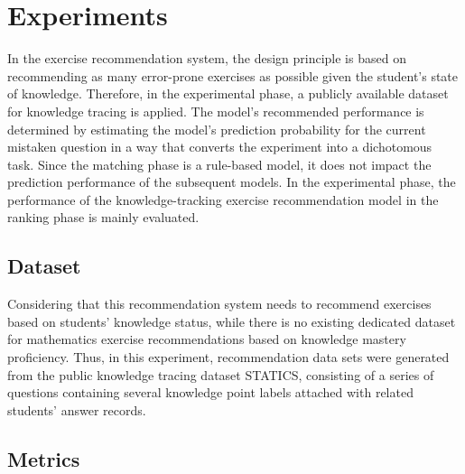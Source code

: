 \section{Experiments}
In the exercise recommendation system, the design principle is based on recommending as many error-prone exercises as possible given the student's state of knowledge. Therefore, in the experimental phase, a publicly available dataset for knowledge tracing is applied. The model's recommended performance is determined by estimating the model's prediction probability for the current mistaken question in a way that converts the experiment into a dichotomous task. Since the matching phase is a rule-based model, it does not impact the prediction performance of the subsequent models. In the experimental phase, the performance of the knowledge-tracking exercise recommendation model in the ranking phase is mainly evaluated.

\subsection{Dataset}

Considering that this recommendation system needs to recommend exercises based on students' knowledge status, while there is no existing dedicated dataset for mathematics exercise recommendations based on knowledge mastery proficiency. Thus, in this experiment, recommendation data sets were generated from the public knowledge tracing dataset STATICS, consisting of a series of questions containing several knowledge point labels attached with related students' answer records.


\subsection{Metrics}


